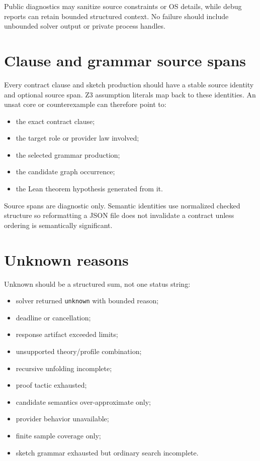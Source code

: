 \documentclass[11pt,oneside]{report}
\begin{document}
Public diagnostics may sanitize source constraints or OS details, while debug reports can retain bounded structured context. No failure should include unbounded solver output or private process handles.

\section{Clause and grammar source spans}

Every contract clause and sketch production should have a stable source identity and optional source span. Z3 assumption literals map back to these identities. An unsat core or counterexample can therefore point to:

\begin{itemize}[leftmargin=2em]
\item the exact contract clause;
\item the target role or provider law involved;
\item the selected grammar production;
\item the candidate graph occurrence;
\item the Lean theorem hypothesis generated from it.
\end{itemize}

Source spans are diagnostic only. Semantic identities use normalized checked structure so reformatting a JSON file does not invalidate a contract unless ordering is semantically significant.

\section{Unknown reasons}

Unknown should be a structured sum, not one status string:

\begin{itemize}[leftmargin=2em]
\item solver returned \texttt{unknown} with bounded reason;
\item deadline or cancellation;
\item response artifact exceeded limits;
\item unsupported theory/profile combination;
\item recursive unfolding incomplete;
\item proof tactic exhausted;
\item candidate semantics over-approximate only;
\item provider behavior unavailable;
\item finite sample coverage only;
\item sketch grammar exhausted but ordinary search incomplete.
\end{itemize}
\end{document}
